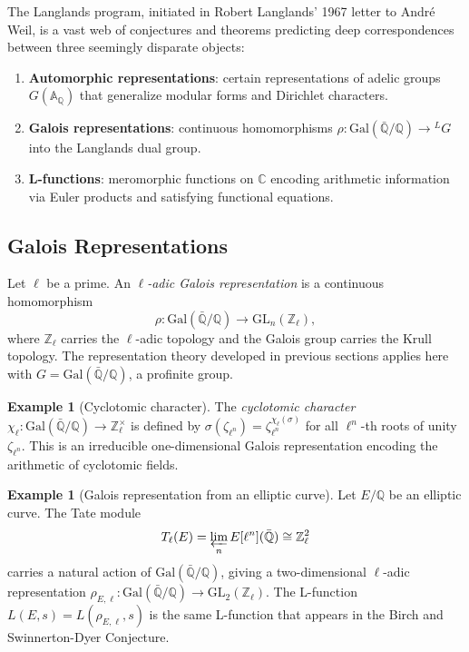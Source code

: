\documentclass[12pt,a4paper]{amsart}
\theoremstyle{definition}
\newtheorem{example}[theorem]{Example}
\begin{document}
The Langlands program, initiated in Robert Langlands' 1967 letter to André Weil,
is a vast web of conjectures and theorems predicting deep correspondences between
three seemingly disparate objects:
\begin{enumerate}
  \item \textbf{Automorphic representations}: certain representations of adelic
        groups $G(\mathbb{A}_{\mathbb{Q}})$ that generalize modular forms and
        Dirichlet characters.
  \item \textbf{Galois representations}: continuous homomorphisms $\rho \colon
        \mathrm{Gal}(\bar{\mathbb{Q}}/\mathbb{Q}) \to {}^L G$ into the
        Langlands dual group.
  \item \textbf{L-functions}: meromorphic functions on $\mathbb{C}$ encoding
        arithmetic information via Euler products and satisfying functional equations.
\end{enumerate}

\subsection{Galois Representations}

Let $\ell$ be a prime.  An \emph{$\ell$-adic Galois representation} is a
continuous homomorphism
\[
    \rho \colon \mathrm{Gal}(\bar{\mathbb{Q}}/\mathbb{Q}) \longrightarrow \mathrm{GL}_n(\mathbb{Z}_\ell),
\]
where $\mathbb{Z}_\ell$ carries the $\ell$-adic topology and the Galois group
carries the Krull topology.  The representation theory developed in previous
sections applies here with $G = \mathrm{Gal}(\bar{\mathbb{Q}}/\mathbb{Q})$, a
profinite group.

\begin{example}[Cyclotomic character]
The \emph{cyclotomic character} $\chi_\ell \colon \mathrm{Gal}(\bar{\mathbb{Q}}/\mathbb{Q})
\to \mathbb{Z}_\ell^\times$ is defined by $\sigma(\zeta_{\ell^n}) = \zeta_{\ell^n}^{\chi_\ell(\sigma)}$
for all $\ell^n$-th roots of unity $\zeta_{\ell^n}$.  This is an irreducible
one-dimensional Galois representation encoding the arithmetic of cyclotomic fields.
\end{example}

\begin{example}[Galois representation from an elliptic curve]
Let $E/\mathbb{Q}$ be an elliptic curve.  The Tate module
\[
    T_\ell(E) = \varprojlim_n E[\ell^n](\bar{\mathbb{Q}}) \cong \mathbb{Z}_\ell^2
\]
carries a natural action of $\mathrm{Gal}(\bar{\mathbb{Q}}/\mathbb{Q})$, giving
a two-dimensional $\ell$-adic representation
$\rho_{E,\ell} \colon \mathrm{Gal}(\bar{\mathbb{Q}}/\mathbb{Q}) \to \mathrm{GL}_2(\mathbb{Z}_\ell)$.
The L-function $L(E,s) = L(\rho_{E,\ell}, s)$ is the same L-function that appears
in the Birch and Swinnerton-Dyer Conjecture.
\end{example}
\end{document}
